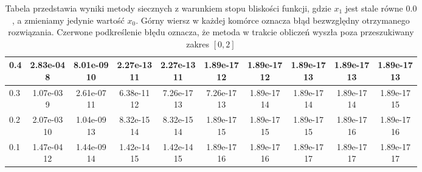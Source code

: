 \begin{table}[H]
\begin{tabular}{|l||c|c|c|c|c|c|c|c|c|}
\hline
 0.4 & \makecell{2.83e-04 \\ 8} & \makecell{8.01e-09 \\ 10} & \makecell{2.27e-13 \\ 11} & \makecell{2.27e-13 \\ 11} & \makecell{1.89e-17 \\ 12} & \makecell{1.89e-17 \\ 12} & \makecell{1.89e-17 \\ 13} & \makecell{1.89e-17 \\ 13} & \makecell{1.89e-17 \\ 13} \\
\hline
 0.3 & \makecell{1.07e-03 \\ 9} & \makecell{2.61e-07 \\ 11} & \makecell{6.38e-11 \\ 12} & \makecell{7.26e-17 \\ 13} & \makecell{7.26e-17 \\ 13} & \makecell{1.89e-17 \\ 14} & \makecell{1.89e-17 \\ 14} & \makecell{1.89e-17 \\ 14} & \makecell{1.89e-17 \\ 15} \\
\hline
 0.2 & \makecell{2.07e-03 \\ 10} & \makecell{1.04e-09 \\ 13} & \makecell{8.32e-15 \\ 14} & \makecell{8.32e-15 \\ 14} & \makecell{1.89e-17 \\ 15} & \makecell{1.89e-17 \\ 15} & \makecell{1.89e-17 \\ 15} & \makecell{1.89e-17 \\ 16} & \makecell{1.89e-17 \\ 16} \\
\hline
 0.1 & \makecell{1.47e-04 \\ 12} & \makecell{1.44e-09 \\ 14} & \makecell{1.42e-14 \\ 15} & \makecell{1.42e-14 \\ 15} & \makecell{1.89e-17 \\ 16} & \makecell{1.89e-17 \\ 16} & \makecell{1.89e-17 \\ 17} & \makecell{1.89e-17 \\ 17} & \makecell{1.89e-17 \\ 17} \\
\hline
 \bottomrule
\end{tabular}
\caption{Tabela przedstawia wyniki metody siecznych z warunkiem stopu bliskości funkcji, gdzie $x_1$ jest stale równe $0.0$, a zmieniamy jedynie wartość $x_0$.
Górny wiersz w każdej komórce oznacza błąd bezwzględny otrzymanego rozwiązania.
Czerwone podkreślenie błędu oznacza, że metoda w trakcie obliczeń wyszła poza przeszukiwany zakres $[0,2]$}
\label{tab:secant_x_b}
\end{table}